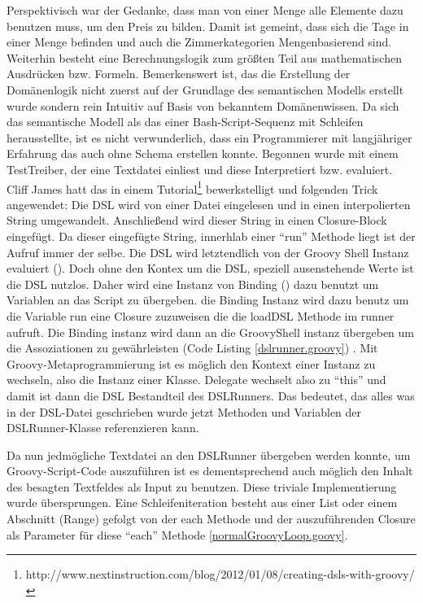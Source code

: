 \documentclass[11pt,english,ngerman, headsepline]{scrreprt}
\begin{document}
Perspektivisch war der Gedanke, dass man von einer Menge alle Elemente dazu
benutzen muss, um den Preis zu bilden. Damit ist gemeint, dass sich die Tage in
einer Menge befinden und auch die Zimmerkategorien Mengenbasierend sind.
Weiterhin besteht eine Berechnungslogik zum größten Teil aus mathematischen
Ausdrücken bzw. Formeln.
Bemerkenswert ist, das die Erstellung der Domänenlogik nicht zuerst auf der
Grundlage des semantischen Modells erstellt wurde sondern rein Intuitiv auf
Basis von bekanntem Domänenwissen. Da sich das semantische Modell als das einer
Bash-Script-Sequenz mit Schleifen herausstellte, ist es nicht verwunderlich,
dass ein Programmierer mit langjähriger Erfahrung das auch ohne Schema erstellen
konnte.
Begonnen wurde mit einem TestTreiber, der eine Textdatei einliest und diese
Interpretiert bzw. evaluiert.
Cliff James hatt das in einem
Tutorial\footnote{http://www.nextinstruction.com/blog/2012/01/08/creating-dsls-with-groovy/}
bewerkstelligt und folgenden Trick angewendet:
Die DSL wird von einer Datei eingelesen und in einen interpolierten String
umgewandelt. Anschließend wird dieser String in einen Closure-Block eingefügt.
Da dieser eingefügte String, innerhlab einer ``run'' Methode liegt ist der
Aufruf immer der selbe.
Die DSL wird letztendlich von der Groovy Shell Instanz evaluiert (\cite[S.
368]{koenig2007groovy}). 
Doch ohne den Kontex um die DSL, speziell ausenstehende Werte ist die DSL nutzlos. Daher wird
eine Instanz von Binding (\cite[S. 368]{koenig2007groovy}) dazu benutzt um
Variablen an das Script zu übergeben.
die Binding Instanz wird dazu benutz um die Variable run eine Closure zuzuweisen
die die loadDSL Methode im runner aufruft. Die Binding instanz wird dann an
die GroovyShell instanz übergeben um die Assoziationen zu gewährleisten (Code
Listing \ref{dslrunner.groovy}) .
Mit Groovy-Metaprogrammierung ist es möglich den Kontext einer Instanz zu
wechseln, also die Instanz einer Klasse. Delegate wechselt also zu ``this'' und
damit ist dann die DSL Bestandteil des DSLRunners. Das bedeutet, das alles was
in der DSL-Datei geschrieben wurde jetzt Methoden und Variablen der
DSLRunner-Klasse referenzieren kann. 
 


Da nun jedmögliche Textdatei an den DSLRunner übergeben werden konnte, um
Groovy-Script-Code auszuführen ist es dementsprechend auch möglich den Inhalt
des besagten Textfeldes als Input zu benutzen. Diese triviale Implementierung
wurde übersprungen. 
 Eine Schleifeniteration besteht aus einer List oder
einem Abschnitt (Range) gefolgt von der each Methode und der auszuführenden
Closure als Parameter für diese ``each'' Methode \ref{normalGroovyLoop.goovy}.
\end{document}
